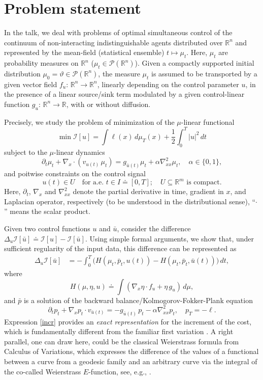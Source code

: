 \documentclass[12pt]{llncs}
\begin{document}
\section{Problem statement} 

In the talk, we deal with problems of optimal simultaneous control of the continuum of non-interacting indistinguishable agents distributed over $\mathbb{R}^n$ and represented by the mean-field (statistical ensemble) $t \mapsto \mu_t$. Here, $\mu_t$ are probability measures on $\mathbb{R}^n$ ($\mu_t \in \mathcal P(\mathbb{R}^n)$). Given a compactly supported initial distribution $\mu_0 =\vartheta\in \mathcal P(\mathbb{R}^n)$, the measure $\mu_t$ is assumed to be transported by a given vector field $f_u: \, \mathbb{R}^n \to \mathbb{R}^n$, linearly depending on the control parameter $u$, in the presence of a linear source/sink term modulated by a given control-linear function $g_u: \, \mathbb{R}^n \to \mathbb{R}$, {with or without diffusion}. 

Precisely, we study the problem of minimization of the $\mu$-linear functional
$$
\min\mathcal I[u] = \int\ell(x) \, d \mu_T(x) + \frac{1}{2}\int_0^T |u|^2 \, d t
$$
subject to the $\mu$-linear dynamics
$$
\partial_t\mu_t + \nabla_x \cdot \left(v_{u(t)} \, \mu_t\right) = g_{\bar u(t)}\mu_t +  \alpha \nabla_{xx}^2 \mu_t, \quad \alpha\in\{0,1\},\label{eq:conteq}
$$
and poitwise constraints on the control signal
\[
u(t)\in U \quad \text{for a.e. }t \in I \doteq [0,T]; \quad U\subseteq \mathbb{R}^m \text{ is compact}.
\]
Here, $\partial_t$, $\nabla_x$ and $ \nabla_{xx}^2$ denote the partial derivative in time, gradient in $x$, and Laplacian operator, respectively (to be understood in the distributional sense), ``$\cdot$'' means the scalar product. 

Given two control functions $u$ and $\bar u$, consider the difference
\(
\Delta_{u} \mathcal I[\bar u] \doteq \mathcal I[u] - \mathcal I[\bar u].
\)
Using simple formal arguments, we show that, under sufficient regularity of the input data, this difference can be represented as 
\begin{align}
\Delta_{u} \mathcal I[\bar u]& = - \int_0^T \Big(H\left(\mu_t, \bar p_t, u(t)\right)-H\left(\mu_t, \bar p_t, \bar u(t)\right)\Big) \, d t,\label{incr}
\end{align}
where
\begin{equation*}
H(\mu, \eta, u) \doteq \int (\nabla_x \eta \cdot f_u + \eta \, g_u) \, d \mu,\label{Ham} 
\end{equation*}
and $\bar p$ is a solution of the backward balance/Kolmogorov-Fokker-Plank equation
\[
\partial_t p_t + \nabla_x p_t \cdot v_{\bar u(t)}  = - g_{\bar u(t)} \, p_t -  \alpha \nabla_{xx}^2 p_t, \quad p_T = - \ell.
\]
Expression \eqref{incr} provides an \emph{exact representation} for the increment of the cost, which is fundamentally different from the familiar first variation \cite{Bonnet}. A right parallel, one can draw here, could be the classical Weierstrass formula from Calculus of Variations, which expresses the difference of the values of a functional between a curve from a geodesic family and an arbitrary curve via the integral of the co-called Weierstrass $E$-function, see, e.g., \cite[\S~12]{Young}.
\end{document}
